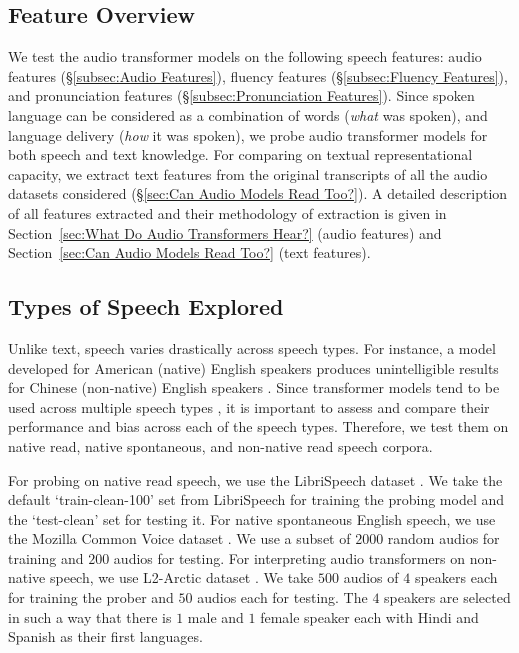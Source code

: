 \documentclass[sigconf]{acmart}
\begin{document}
\subsection{Feature Overview}
\label{sec:Feature Overview}
We test the audio transformer models on the following speech features: audio features (\S\ref{subsec:Audio Features}), fluency features (\S\ref{subsec:Fluency Features}), and pronunciation features (\S\ref{subsec:Pronunciation Features}). Since spoken language can be considered as a combination of words (\textit{what} was spoken), and language delivery (\textit{how} it was spoken), we probe audio transformer models for both speech and text knowledge. For comparing on textual representational capacity, we extract text features from the original transcripts of all the audio datasets considered (\S\ref{sec:Can Audio Models Read Too?}).  %
A detailed description of all features extracted and their methodology of extraction is given in Section~\ref{sec:What Do Audio Transformers Hear?} (audio features) and Section~\ref{sec:Can Audio Models Read Too?} (text features).


\subsection{Types of Speech Explored} 
\label{sec:Types of Speech Explored}
Unlike text, speech varies drastically across speech types. For instance, a model developed for American (native) English speakers produces unintelligible results for Chinese (non-native) English speakers \cite{mulholland2016comparison}. Since transformer models tend to be used across multiple speech types \cite{grover2020multi,doumbouya2021using}, it is important to assess and compare their performance and bias across each of the speech types. Therefore, we test them on native read, native spontaneous, and non-native read speech corpora. 


For probing on native read speech, we use the LibriSpeech dataset \cite{panayotov2015librispeech}. We take the default `train-clean-100' set from LibriSpeech for training the probing model and the `test-clean' set for testing it. For native spontaneous English speech, we use the Mozilla Common Voice dataset \cite{ardila2019common}. We use a subset of $2000$ random audios for training and $200$ audios for testing.
For interpreting audio transformers on non-native speech, we use L2-Arctic dataset \cite{zhao2018l2arctic}. We take $500$ audios of $4$ speakers each for training the prober and $50$ audios each for testing. The $4$ speakers are selected in such a way that there is $1$ male and $1$ female speaker each with Hindi and Spanish as their first languages. 
\end{document}
